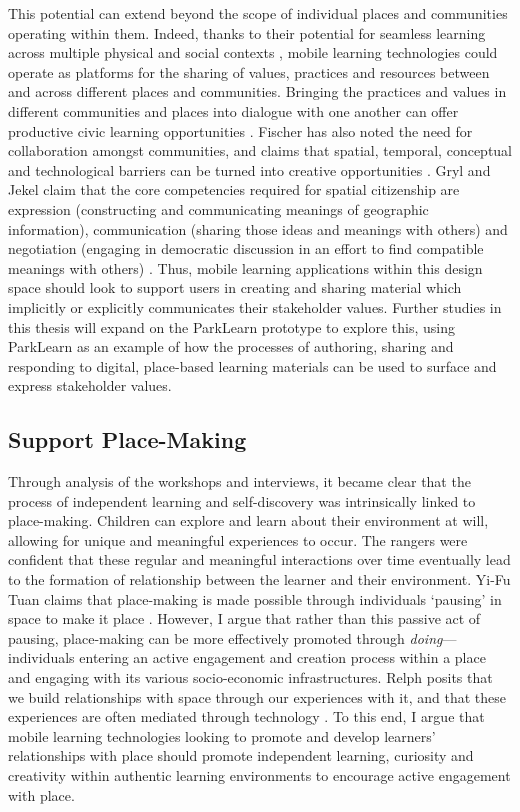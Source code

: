 This potential can extend beyond the scope of individual places and communities operating within them. Indeed, thanks to their potential for seamless learning across multiple physical and social contexts \citep{Wong2011}, mobile learning technologies could operate as platforms for the sharing of values, practices and resources between and across different places and communities. Bringing the practices and values in different communities and places into dialogue with one another can offer productive civic learning opportunities \citep{Wegerif2007}.  Fischer has also noted the need for collaboration amongst communities,  and claims that spatial, temporal, conceptual and technological barriers can be turned into creative opportunities \citep{Fischer2004}. Gryl and Jekel claim that the core competencies required for spatial citizenship are expression (constructing and communicating meanings of geographic information), communication (sharing those ideas and meanings with others) and negotiation (engaging in democratic discussion in an effort to find compatible meanings with others) \citep{Gryl2012}. Thus, mobile learning applications within this design space should look to support users in creating and sharing material which implicitly or explicitly communicates their stakeholder values. Further studies in this thesis will expand on the ParkLearn prototype to explore this, using ParkLearn as an example of how the processes of authoring, sharing and responding to digital, place-based learning materials can be used to surface and express stakeholder values.

\subsection{Support Place-Making}

Through analysis of the workshops and interviews, it became clear that the process of independent learning and self-discovery was intrinsically linked to place-making. Children can explore and learn about their environment at will, allowing for unique and meaningful experiences to occur. The rangers were confident that these regular and meaningful interactions over time eventually lead to the formation of relationship between the learner and their environment. Yi-Fu Tuan claims that place-making is made possible through individuals ‘pausing’ in space to make it place \citep{Tuan1978}. However, I argue that rather than this passive act of pausing, place-making can be more effectively promoted through \textit{doing}---individuals entering an active engagement and creation process within a place and engaging with its various socio-economic infrastructures. Relph posits that we build relationships with space through our experiences with it, and that these experiences are often mediated through technology \citep{Relph1976}. To this end, I argue that mobile learning technologies looking to promote and develop learners' relationships with place should promote independent learning, curiosity and creativity within authentic learning environments to encourage active engagement with place.

